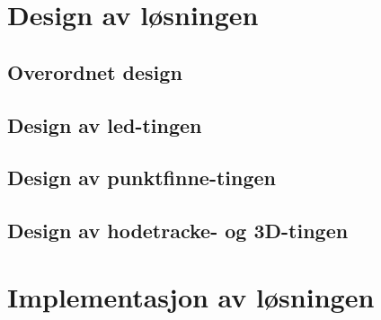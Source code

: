 \section{Design av l\o sningen}

	\subsection{Overordnet design}
	
		
	
	\subsection{Design av led-tingen}
	
		
	
	\subsection{Design av punktfinne-tingen}
	
		
	
	\subsection{Design av hodetracke- og 3D-tingen}
	
		
	
\section{Implementasjon av l\o sningen}

	